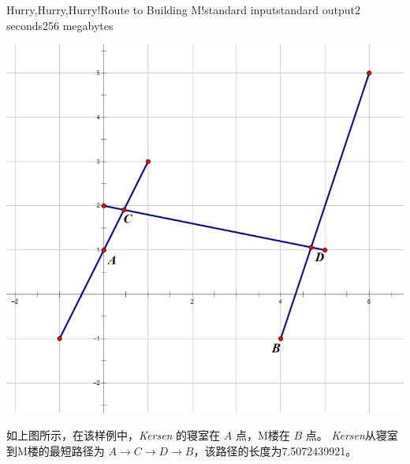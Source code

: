 \documentclass[12pt,a4paper,oneside]{article}
\begin{document}
\begin{problem}{Hurry,Hurry,Hurry!Route to Building M!}{standard input}{standard output}{2 seconds}{256 megabytes}
	\Explanations
    \begin{center}
	  \includegraphics[width=0.7\linewidth]{F/testcase.png}
	\end{center}
    如上图所示，在该样例中，\textit{Kersen} 的寝室在 $A$ 点，M楼在 $B$ 点。  
    \textit{Kersen}从寝室到M楼的最短路径为 $A\rightarrow C \rightarrow D \rightarrow B$，该路径的长度为7.5072439921。
	
	\end{problem}

\end{document}
